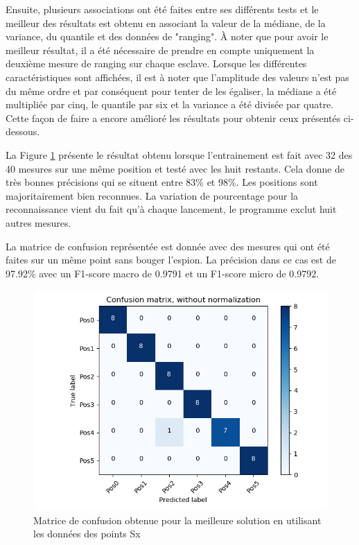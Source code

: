 Ensuite, plusieurs associations ont été faites entre ses différents tests et le meilleur des résultats est obtenu en associant la valeur de la médiane, de la variance, du quantile et des données de "ranging". À noter que pour avoir le meilleur résultat, il a été nécessaire de prendre en compte uniquement la deuxième mesure de ranging sur chaque esclave. Lorsque les différentes caractéristiques sont affichées, il est à noter que l'amplitude des valeurs n'est pas du même ordre et par conséquent pour tenter de les égaliser, la médiane a été multipliée par cinq, le quantile par six et la variance a été divisée par quatre. Cette façon de faire a encore amélioré les résultats pour obtenir ceux présentés ci-dessous.

La Figure \ref{fig:matPosSx} présente le résultat obtenu lorsque l'entrainement est fait avec 32 des 40 mesures sur une même position et testé avec les huit restants. Cela donne de très bonnes précisions qui se situent entre 83\% et 98\%. Les positions sont majoritairement bien reconnues. La variation de pourcentage pour la reconnaissance vient du fait qu'à chaque lancement, le programme exclut huit autres mesures.

La matrice de confusion représentée est donnée avec des mesures qui ont été faites sur un même point sans bouger l'espion. La précision dans ce cas est de 97.92\% avec un F1-score macro de 0.9791 et un F1-score micro de 0.9792. 

\begin{figure}[H]
 \begin{center}
  \includegraphics[scale=0.5]{figures/mat_pos_Sx.PNG}
  \caption{Matrice de confusion obtenue pour la meilleure solution en utilisant les données des points Sx}
  \label{fig:matPosSx} %
 \end{center}
\end{figure}

